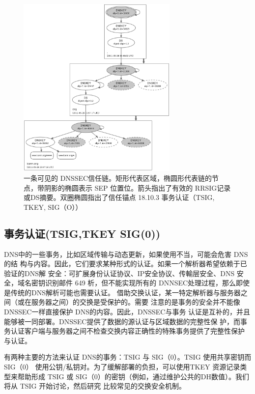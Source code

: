 \begin{figure}[!htb]
    \centering
	\includegraphics[width=0.7\textwidth]{imgs/18/18-43.png}
	\caption{一条可见的 DNSSEC信任链。矩形代表区域，椭圆形代表链的节点，带阴影的椭圆表示
            SEP 位置位。箭头指出了有效的 RRSIG记录或DS摘要。双圈椭圆指出了信任锚点
            18.10.3 事务认证（TSIG, TKEY, SIG（O））}
\end{figure}

\subsection{事务认证(TSIG,TKEY SIG(0))}

DNS中的一些事务，比如区域传输与动态更新，如果使用不当，可能会危害 DNS的结
构与内容。因此，它们要求某种形式的认证。如果一个解析器希望依赖于已验证的DNS解
安全：可扩展身份认证协议、IP安全协议、传輸层安全、DNS 安全，域名密钥识别邮件 649
析，但不能实现所有的 DNNSEC处理过程，那么即使是传统的DNS解析可能也需要认证。
借助交换认证，某一特定解析器与服务器之间（或在服务器之间）的交换是受保护的。需要
注意的是事务的安全并不能像 DNSSEC一样直接保护 DNS的内容。因此，DNSSEC与事务
认证是互补的，并且能够被一同部署。DNSSEC提供了数据的源认证与区域数据的完整性保
护，而事务认证客户端与服务器之间不检查交换内容正确性的特殊事务提供了完整性保护
与认证。

有两种主要的方法来认证 DNS的事务：TSIG 与 SIG（0）。TSIG 使用共享密钥而SIG（0）
使用公钥/私钥对。为了缓解部署的负担，可以使用TKEY 资源记录类型来帮助形成 TSIG
或 SIG（0）的密钥（例如，通过维护公共的DH数值）。我们将从 TSIG 开始讨论，然后研究
比较常见的交换安全机制。

